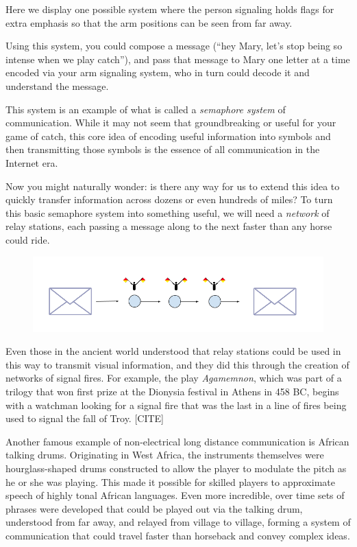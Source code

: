 \documentclass[UTF8]{book}
\begin{document}
\begin{CJK}{UTF8}{gbsn}
Here we display one possible system where the person signaling holds flags for extra emphasis so that the arm positions can be seen from far away.

Using this system, you could compose a message (``hey Mary, let's stop being so intense when we play catch''), and pass that message to Mary one letter at a time encoded via your arm signaling system, who in turn could decode it and understand the message.

This system is an example of what is called a \emph{semaphore system} of communication. While it may not seem that groundbreaking or useful for your game of catch, this core idea of encoding useful information into symbols and then transmitting those symbols is the essence of all communication in the Internet era.

Now you might naturally wonder: is there any way for us to extend this idea to quickly transfer information across dozens or even hundreds of miles? To turn this basic semaphore system into something useful, we will need a \emph{network} of relay stations, each passing a message along to the next faster than any horse could ride.

\begin{figure}[H]
\centering
\includegraphics[width=0.9\linewidth]{relay_stations}
\end{figure}

Even those in the ancient world understood that relay stations could be used in this way to transmit visual information, and they did this through the creation of networks of signal fires. For example, the play \emph{Agamemnon}, which was part of a trilogy that won first prize at the Dionysia festival in Athens in 458 BC, begins with a watchman looking for a signal fire that was the last in a line of fires being used to signal the fall of Troy. [CITE]

Another famous example of non-electrical long distance communication is African talking drums. Originating in West Africa, the instruments themselves were hourglass-shaped drums constructed to allow the player to modulate the pitch as he or she was playing. This made it possible for skilled players to approximate speech of highly tonal African languages. Even more incredible, over time sets of phrases were developed that could be played out via the talking drum, understood from far away, and relayed from village to village, forming a system of communication that could travel faster than horseback and convey complex ideas.


\end{CJK}
\end{document}

